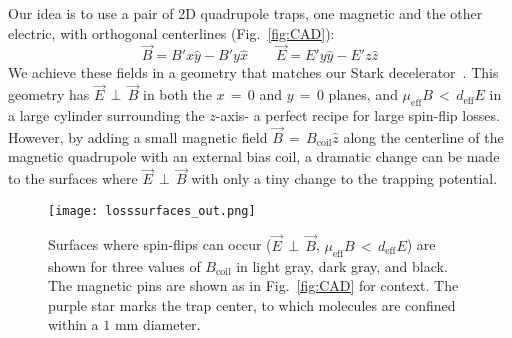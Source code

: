 \documentclass[%
 reprint,
 amsmath,amssymb,
 aps,
prl,
]{revtex4-1}
\newcommand{\bcl}{{$B_\text{coil}$}}
\newcommand{\epb}{{$\vec{E}\,{\perp}\,\vec{B}$}}
\begin{document}

Our idea is to use a pair of 2D quadrupole traps, one magnetic and the other electric, with orthogonal centerlines (Fig.~\ref{fig:CAD}):
\begin{equation}
\vec{B}=B'x\hat{y}-B'y\hat{x}\quad\quad\vec{E}=E'y\hat{y}-E'z\hat{z}
\end{equation}
We achieve these fields in a geometry that matches our Stark decelerator~\cite{Bochinski2003}. 
This geometry has \epb{} in both the $x\,{=}\,0$ and $y\,{=}\,0$ planes, and $\mu_\text{eff}B \,{<}\, d_\text{eff}E$ in a large cylinder surrounding the $z$-axis- a perfect recipe for large spin-flip losses.
However, by adding a small magnetic field $\vec{B}\,{=}\,B_\text{coil}\hat{z}$ along the centerline of the magnetic quadrupole with an external bias coil, a dramatic change can be made to the surfaces where \epb{} with only a tiny change to the trapping potential.


\begin{figure}[tb]
\texttt{[image: losssurfaces\_out.png]}%
\caption{
Surfaces where spin-flips can occur (\epb{}, $\mu_\text{eff}B\,{<}\,d_\text{eff}E$) are shown for three values of \bcl{} in light gray, dark gray, and black. 
The magnetic pins are shown as in Fig.~\ref{fig:CAD} for context. 
The purple star marks the trap center, to which molecules are confined within a \raisebox{2.5px}{\texttildelow} $\!\!1\text{ mm}$ diameter.
\label{fig:LSurfs}}
\end{figure}
\end{document}
